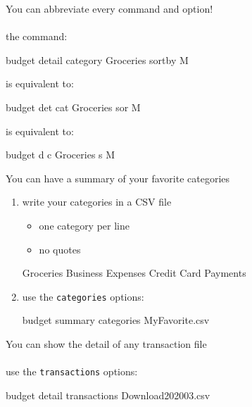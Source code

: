 \documentclass[12pt,letterpaper]{article}
\begin{document}
\Large
\begin{framed}
    \begin{minipage}[t][3in][t]{5in}
        You can abbreviate every command and option! \\ \\
        the command:
        \begin{budget}
            budget detail category Groceries sortby M
        \end{budget}
        is equivalent to: 
        \begin{budget}
            budget det cat Groceries sor M
        \end{budget}
        is equivalent to: 
        \begin{budget}
            budget d c Groceries s M
        \end{budget}
    \end{minipage}
\end{framed}
\begin{framed}
    \begin{minipage}[t][3in][t]{5in}
        You can have a summary of your favorite categories 
        \large
        \begin{enumerate}
            \item write your categories in a CSV file
                \begin{itemize}
                    \item one category per line
                    \item no quotes
                \end{itemize}
                \begin{budget}
                    Groceries
                    Business Expenses
                    Credit Card Payments
                \end{budget}
            \item use the \lstinline[language=budget,basicstyle=\large]!categories! options:
                \begin{budget}
                    budget summary categories MyFavorite.csv 
                \end{budget}
        \end{enumerate}
    \end{minipage}
\end{framed}
\begin{framed}
    \begin{minipage}[t][3in][t]{5in}
        \large
        You can show the detail of any transaction file\\ \\
        use the \lstinline[language=budget,basicstyle=\large]!transactions! options: \\
        \begin{budget}
            budget detail transactions Download202003.csv
        \end{budget}
    \end{minipage}
\end{framed}
\end{document}

